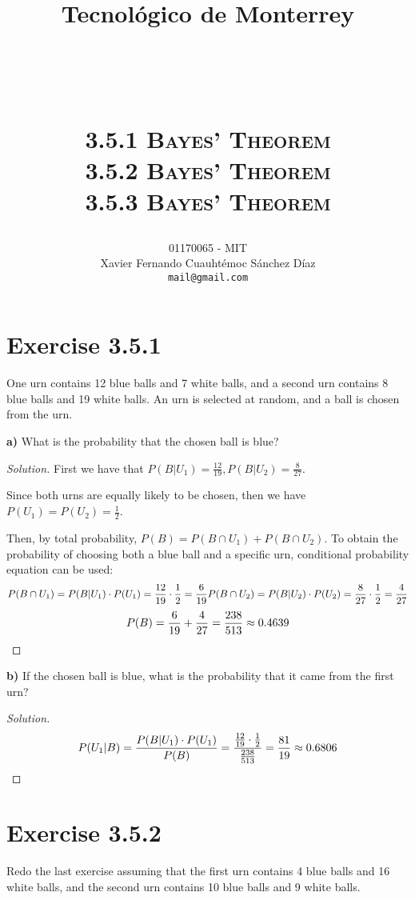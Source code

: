 \documentclass[titlepage, letterpaper, fleqn]{article}
\title{
\vspace{1in}
\textbf{Tecnológico de Monterrey} \\
\vspace{0.5in}
\textmd{\mahclass} \\
\large{\textit{\mahteacher}} \\
\vspace{0.5in}
\textsc{\mahtitle}\\
\textsc{3.5.1 Bayes' Theorem}\\
\textsc{3.5.2 Bayes' Theorem}\\
\textsc{3.5.3 Bayes' Theorem}\\
\author{01170065  - MIT \\
Xavier Fernando Cuauhtémoc Sánchez Díaz \\
\texttt{mail@gmail.com}}
\date{\mahdate}
}
\newcommand{\spacepls}{\vspace{5mm}}
\renewcommand\qedsymbol{\(\blacksquare\)}
\newenvironment{solution}
{\renewcommand\qedsymbol{$\square$}\begin{proof}[Solution]}
{\end{proof}}
\begin{document}
\begin{titlepage}
\maketitle
\end{titlepage}

%
%

\section{Exercise 3.5.1}

{\large One urn contains 12 blue balls and 7 white balls, and a second urn contains 8 blue balls and 19 white balls.
An urn is selected at random, and a ball is chosen from the urn.

\textbf{a)} What is the probability that the chosen ball is blue?}

\begin{solution}
First we have that \(P(B|U_1) = \frac{12}{19}, P(B|U_2) = \frac{8}{27}\).

Since both urns are equally likely to be chosen, then we have \(P(U_1) = P(U_2) = \frac{1}{2}\).

Then, by total probability, \(P(B) = P(B \cap U_1) + P(B \cap U_2)\).
To obtain the probability of choosing both a blue ball and a specific urn, conditional probability equation can be used:
\[P(B \cap U_1) = P(B|U_1) \cdot P(U_1) = \frac{12}{19} \cdot \frac{1}{2} = \frac{6}{19} \\
P(B \cap U_2) = P(B|U_2) \cdot P(U_2) = \frac{8}{27} \cdot \frac{1}{2} = \frac{4}{27}\]
\[P(B) = \frac{6}{19} + \frac{4}{27} = \frac{238}{513} \approx 0.4639 \qedhere \]
\end{solution}

\spacepls

{\large \textbf{b)} If the chosen ball is blue, what is the probability that it came from the first urn?}

\begin{solution}
\[P(U_1|B) = \frac{P(B|U_1) \cdot P(U_1)}{P(B)} = \frac{\frac{12}{19} \cdot \frac{1}{2}}{\frac{238}{513}} = \frac{81}{19} \approx 0.6806 \qedhere\]
\end{solution}

\section{Exercise 3.5.2}

{\large Redo the last exercise assuming that the first urn contains 4 blue balls and 16 white balls,
and the second urn contains 10 blue balls and 9 white balls.}
\end{document}
